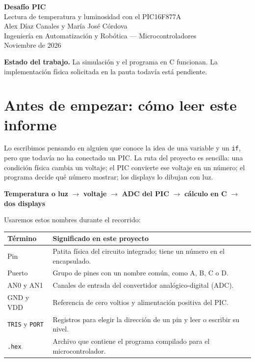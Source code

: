 \documentclass[11pt,a4paper]{article}
\begin{document}
\begin{center}
  {\Large\bfseries\color{azul} Desafío PIC}\\[0.25cm]
  {\large Lectura de temperatura y luminosidad con el PIC16F877A}\\[0.45cm]
  {\normalsize Alex Díaz Canales y María José Córdova}\\[0.15cm]
  {\normalsize Ingeniería en Automatización y Robótica --- Microcontroladores}\\[0.15cm]
  {\normalsize Noviembre de 2026}
\end{center}

\noindent\colorbox{verde}{\parbox{\dimexpr\linewidth-2\fboxsep\relax}{\textbf{Estado del trabajo.}
La simulación y el programa en C funcionan. La implementación física solicitada en la pauta todavía está pendiente.}}

\section*{Antes de empezar: cómo leer este informe}

Lo escribimos pensando en alguien que conoce la idea de una variable y un \texttt{if}, pero que todavía no ha conectado un PIC. La ruta del proyecto es sencilla: una condición física cambia un voltaje; el PIC convierte ese voltaje en un número; el programa decide qué número mostrar; los displays lo dibujan con luz.

\begin{center}
\colorbox{lila}{\parbox{0.91\linewidth}{\centering
\textbf{Temperatura o luz} $\longrightarrow$ \textbf{voltaje} $\longrightarrow$
\textbf{ADC del PIC} $\longrightarrow$ \textbf{cálculo en C} $\longrightarrow$
\textbf{dos displays}}}
\end{center}

Usaremos estos nombres durante el recorrido:

\begin{center}
\small
\begin{tabularx}{\linewidth}{@{}lX@{}}
\toprule
Término & Significado en este proyecto \\
\midrule
Pin & Patita física del circuito integrado; tiene un número en el encapsulado. \\
Puerto & Grupo de pines con un nombre común, como A, B, C o D. \\
AN0 y AN1 & Canales de entrada del convertidor analógico-digital (ADC). \\
GND y VDD & Referencia de cero voltios y alimentación positiva del PIC. \\
\texttt{TRIS} y \texttt{PORT} & Registros para elegir la dirección de un pin y leer o escribir su nivel. \\
\texttt{.hex} & Archivo que contiene el programa compilado para el microcontrolador. \\
\bottomrule
\end{tabularx}
\end{center}
\end{document}
